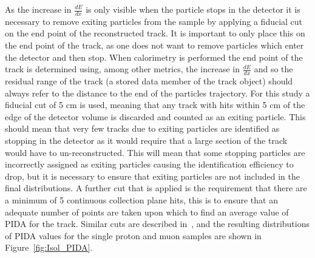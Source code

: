 As the increase in $\frac{dE}{dx}$ is only visible when the particle stops in the detector it is necessary to remove exiting particles from the sample by applying a fiducial cut on the end point of the reconstructed track. It is important to only place this on the end point of the track, as one does not want to remove particles which enter the detector and then stop. When calorimetry is performed the end point of the track is determined using, among other metrics, the increase in $\frac{dE}{dx}$ and so the residual range of the track (a stored data member of the track object) should always refer to the distance to the end of the particles trajectory. For this study a fiducial cut of 5 cm is used, meaning that any track with hits within 5 cm of the edge of the detector volume is discarded and counted as an exiting particle. This should mean that very few tracks due to exiting particles are identified as stopping in the detector as it would require that a large section of the track would have to un-reconstructed. This will mean that some stopping particles are incorrectly assigned as exiting particles causing the identification efficiency to drop, but it is necessary to ensure that exiting particles are not included in the final distributions. A further cut that is applied is the requirement that there are a minimum of 5 continuous collection plane hits, this is to ensure that an adequate number of points are taken upon which to find an average value of PIDA for the track. Similar cuts are described in~\citep{PIDA_Paper}, and the resulting distributions of PIDA values for the single proton and muon samples are shown in Figure~\ref{fig:Isol_PIDA}. \\

